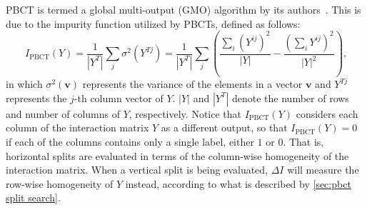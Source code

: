 \documentclass[sn-mathphys-num]{sn-jnl}%
\newcommand{\T}{^T}
\theoremstyle{thmstyleone}%
\theoremstyle{thmstyletwo}%
\theoremstyle{thmstylethree}%
\begin{document}
PBCT is termed a global multi-output (GMO) algorithm by its authors~\cite{pliakos_global_2018}.
This is due to the impurity function utilized by PBCTs, defined as follows:
%
\begin{equation}
    \label{eq:i pbct}
    I_\text{PBCT} (Y)
        = \frac{1}{|Y\T|} \sum_{j}\sigma^2(Y^{Tj})
        = \frac{1}{|Y\T|} \sum_{j} \left(
            \frac{\sum_i (Y^{ij})^2}{|Y|}
            - \frac{(\sum_i Y^{ij})^2}{|Y|^2}
        \right)
    \text{,}
\end{equation}
in which $\sigma^2(\mathbf{v})$ represents the variance of the elements in a vector $\mathbf{v}$ and $Y^{Tj}$ represents the $j$-th column vector of $Y$. $|Y|$ and $|Y^T|$ denote the number of rows and number of columns of $Y$, respectively.
%
Notice that $I_\text{PBCT}(Y)$ considers each column of the interaction matrix $Y$ as a different output, so that $I_\text{PBCT}(Y) = 0$ if each of the columns contains only a single label, either $1$ or $0$.
That is, horizontal splits are evaluated in terms of the column-wise homogeneity of the interaction matrix.
When a vertical split is being evaluated, $\Delta I$ will measure the row-wise homogeneity of $Y$ instead, according to what is described by \autoref{sec:pbct split search}.


\end{document}
